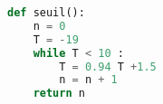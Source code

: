 \begin{center}
\begin{lstlisting}[language=Python]
def seuil():
	n = 0
	T = -19
	while T < 10 :
		T = 0.94 T +1.5
		n = n + 1
	return n
\end{lstlisting}
\end{center}